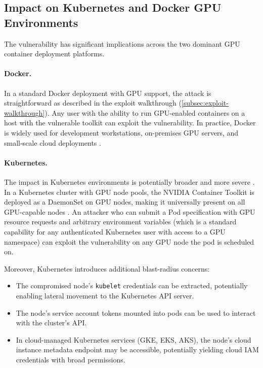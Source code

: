 \subsection{Impact on Kubernetes and Docker GPU Environments}
\label{subsec:k8s-impact}

The vulnerability has significant implications across the two dominant GPU container deployment platforms.

\paragraph{Docker.} In a standard Docker deployment with GPU support, the attack is straightforward as described in the exploit walkthrough (\ref{subsec:exploit-walkthrough}). Any user with the ability to run GPU-enabled containers on a host with the vulnerable toolkit can exploit the vulnerability. In practice, Docker is widely used for development workstations, on-premises GPU servers, and small-scale cloud deployments \cite{nvd_cve_2025_23266}.
 
\paragraph{Kubernetes.} The impact in Kubernetes environments is potentially broader and more severe \cite{k8s_security_docs}. In a Kubernetes cluster with GPU node pools, the NVIDIA Container Toolkit is deployed as a DaemonSet on GPU nodes, making it universally present on all GPU-capable nodes \cite{k8s_device_plugin}. An attacker who can submit a Pod specification with GPU resource requests and arbitrary environment variables (which is a standard capability for any authenticated Kubernetes user with access to a GPU namespace) can exploit the vulnerability on any GPU node the pod is scheduled on.

Moreover, Kubernetes introduces additional blast-radius concerns:
\begin{itemize}
  \item The compromised node's \texttt{kubelet} credentials can be extracted, potentially enabling lateral movement to the Kubernetes API server.
  \item The node's service account tokens mounted into pods can be used to interact with the cluster's API.
  \item In cloud-managed Kubernetes services (GKE, EKS, AKS), the node's cloud instance metadata endpoint may be accessible, potentially yielding cloud IAM credentials with broad permissions.
\end{itemize}

